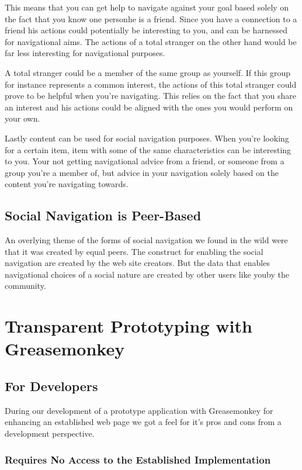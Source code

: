 This means that you can get help to navigate against your goal based solely
on the fact that you know one person\dash{}he is a friend. Since you have a
connection to a friend his actions could potentially be interesting to you,
and can be harnessed for navigational aims. The actions of a total stranger
on the other hand would be far less interesting for navigational purposes.

A total stranger could be a member of the same group as yourself. If this
group for instance represents a common interest, the actions of this total
stranger could prove to be helpful when you're navigating. This relies on the
fact that you share an interest and his actions could be aligned with
the ones you would perform on your own.

Lastly content can be used for social navigation purposes. When you're looking
for a certain item, item with some of the same characteristics can be
interesting to you. Your not getting navigational advice from a friend, or
someone from a group you're a member of, but advice in your navigation solely
based on the content you're navigating towards.

\subsection{Social Navigation is Peer-Based}

An overlying theme of the forms of social navigation we found in the wild were
that it was created by equal peers. The construct for enabling the social
navigation are created by the web site creators. But the data that
enables navigational choices of a social nature are created by other users
like you\dash{}by the community.

\section{Transparent Prototyping with Greasemonkey}

\subsection{For Developers}

During our development of a prototype application with Greasemonkey for
enhancing an established web page we got a feel for it's pros and cons from a
development perspective.

\subsubsection{Requires No Access to the Established Implementation}

